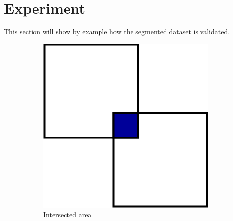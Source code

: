 \newpage
\section{Experiment} %
\label{sec:experiment}

This section will show by example how the segmented dataset is validated.  



\begin{figure}[ht]
  \centering
  \begin{subfigure}{0.25\textwidth}
    \centering
    \includegraphics[width=\textwidth]{./images/experiment/intersection.png}
    \caption{Intersected area}
    \label{fig:experiment:intersection}
  \end{subfigure}
  \begin{subfigure}{0.25\textwidth}
    \centering

\end{subfigure}
\end{figure}
